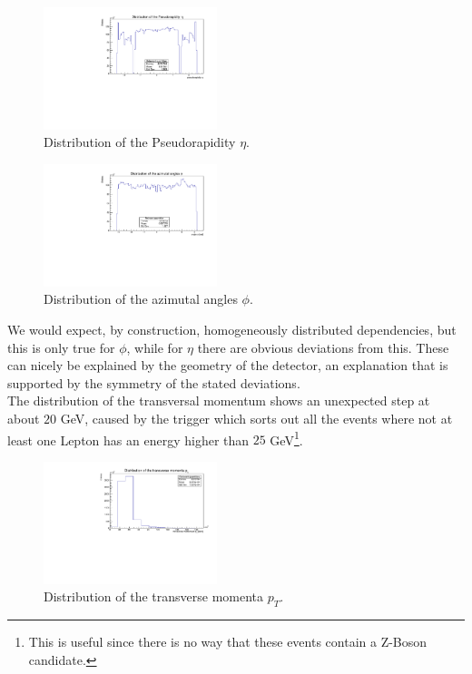 \documentclass[twocolumn,
			   showpacs,%
               nofootinbib,
               aps,%
               prd,
               notitlepage,
               showkeys,
               10pt]{revtex4-1}
\begin{document}
\begin{figure}[H]
	\centering
	\includegraphics[width=0.45\textwidth]{figures/plots/Pseudorapidity}
	\caption{Distribution of the Pseudorapidity $\eta$.}
\end{figure}

\begin{figure}[H]
	\centering
	\includegraphics[width=0.45\textwidth]{figures/plots/AzimutalAngle}
	\caption{Distribution of the azimutal angles $\phi$.}
\end{figure}

We would expect, by construction, homogeneously distributed dependencies, but this is only true for $\phi$, while for $\eta$ there are obvious deviations from this.
These can nicely be explained by the geometry of the detector, an explanation that is supported by the symmetry of the stated deviations.\\

The distribution of the transversal momentum shows an unexpected step at about $20$ GeV, caused by the trigger which sorts out all the events where not at least one Lepton has an energy higher than $25$ GeV\footnote{This is useful since there is no way that these events contain a Z-Boson candidate.}.
\begin{figure}[H]
	\centering
	\includegraphics[width=0.45\textwidth]{figures/plots/TransverseMomentum}
	\caption{Distribution of the transverse momenta $p_T$.}
\end{figure}
\end{document}
